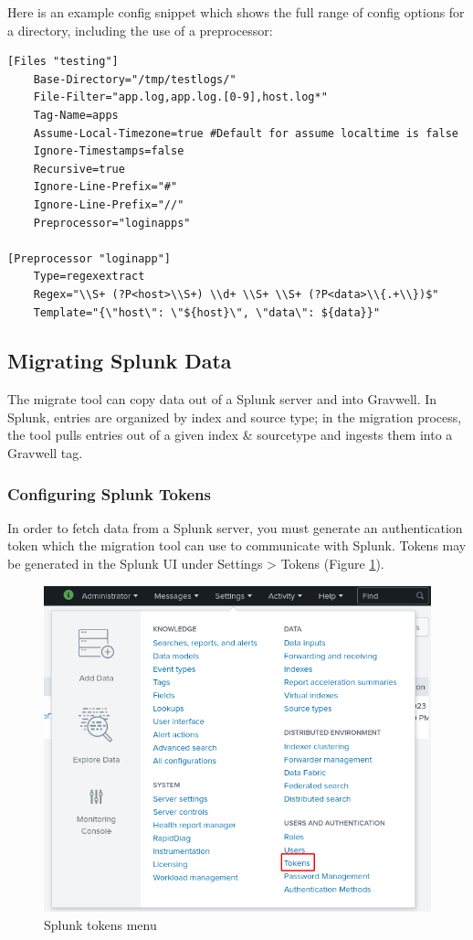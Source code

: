 Here is an example config snippet which shows the full range of config options for a directory, including the use of a preprocessor:


\begin{verbatim}
[Files "testing"]
	Base-Directory="/tmp/testlogs/"
	File-Filter="app.log,app.log.[0-9],host.log*"
	Tag-Name=apps
	Assume-Local-Timezone=true #Default for assume localtime is false
	Ignore-Timestamps=false
	Recursive=true
	Ignore-Line-Prefix="#"
	Ignore-Line-Prefix="//"
	Preprocessor="loginapps"

[Preprocessor "loginapp"]
	Type=regexextract
	Regex="\\S+ (?P<host>\\S+) \\d+ \\S+ \\S+ (?P<data>\\{.+\\})$"
	Template="{\"host\": \"${host}\", \"data\": ${data}}"
\end{verbatim}

\clearpage

\subsection{Migrating Splunk Data}

The migrate tool can copy data out of a Splunk server and into Gravwell. In Splunk, entries are organized by index and source type; in the migration process, the tool pulls entries out of a given index \& sourcetype and ingests them into a Gravwell tag.

\subsubsection{Configuring Splunk Tokens}

In order to fetch data from a Splunk server, you must generate an authentication token which the migration tool can use to communicate with Splunk. Tokens may be generated in the Splunk UI under Settings > Tokens (Figure \ref{fig:tokensmenu}).

\begin{figure}
	\includegraphics[width=0.8\linewidth]{images/tokensmenu.png}
	\caption{Splunk tokens menu}
	\label{fig:tokensmenu}
\end{figure}

